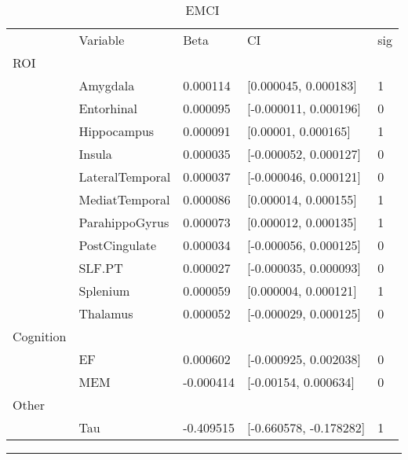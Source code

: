 \documentclass{article}
\begin{document}
\begin{table}[H]
\centering
\caption{EMCI} 
\begin{tabular}{lllll}
   & Variable & Beta & CI & sig \\ 
 ROI &   &   &   &  \\ 
   \rowcolor{green!10}  & Amygdala & 0.000114 & [0.000045, 0.000183] & 1 \\ 
    & Entorhinal & 0.000095 & [-0.000011, 0.000196] & 0 \\ 
   \rowcolor{green!10}  & Hippocampus & 0.000091 & [0.00001, 0.000165] & 1 \\ 
    & Insula & 0.000035 & [-0.000052, 0.000127] & 0 \\ 
    & LateralTemporal & 0.000037 & [-0.000046, 0.000121] & 0 \\ 
   \rowcolor{green!10}  & MediatTemporal & 0.000086 & [0.000014, 0.000155] & 1 \\ 
   \rowcolor{green!10}  & ParahippoGyrus & 0.000073 & [0.000012, 0.000135] & 1 \\ 
    & PostCingulate & 0.000034 & [-0.000056, 0.000125] & 0 \\ 
    & SLF.PT & 0.000027 & [-0.000035, 0.000093] & 0 \\ 
   \rowcolor{green!10}  & Splenium & 0.000059 & [0.000004, 0.000121] & 1 \\ 
    & Thalamus & 0.000052 & [-0.000029, 0.000125] & 0 \\ 
   \midrule
Cognition &   &   &   &  \\ 
    & EF & 0.000602 & [-0.000925, 0.002038] & 0 \\ 
    & MEM & -0.000414 & [-0.00154, 0.000634] & 0 \\ 
   \midrule
Other &   &   &   &  \\ 
   \rowcolor{green!10}  & Tau & -0.409515 & [-0.660578, -0.178282] & 1 \\ 
  \end{tabular}
\end{table}
\noindent\rule[0.5ex]{\linewidth}{1pt}
\end{document}
